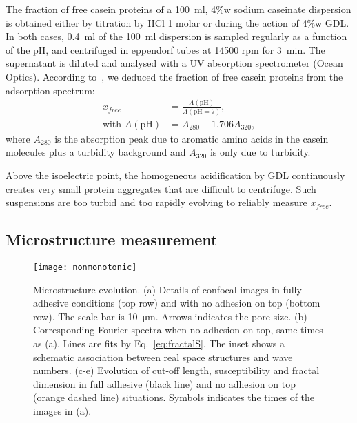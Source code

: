 \documentclass[twocolumn,superscriptaddress,showpacs,preprintnumbers,
amsmath,amssymb,prl]{revtex4-1}
\begin{document}
The fraction of free casein proteins of a \SI{100}{\milli\litre}, 4\%w sodium caseinate dispersion is obtained either by titration by HCl 1 molar or during the action of 4\%w GDL. In both cases, \SI{0.4}{\milli\litre} of the \SI{100}{\milli\litre} dispersion is sampled regularly as a function of the pH, and centrifuged in eppendorf tubes at 14500 rpm for \SI{3}{\minute}. The supernatant is diluted and analysed with a UV absorption spectrometer (Ocean Optics). According to~\cite{Roefs1986}, we deduced the fraction of free casein proteins from the adsorption spectrum:
%
\begin{align}
x_{free} &= \frac{A(\text{pH})}{A(\text{pH}=7)},\\
\text{with }A(\text{pH}) &= A_{280}-1.706 A_{320},
\end{align}
%
where $A_{280}$ is the absorption peak due to aromatic amino acids in the casein molecules plus a turbidity background and $A_{320}$ is only due to turbidity. 

Above the isoelectric point, the homogeneous acidification by GDL continuously creates very small protein aggregates that are difficult to centrifuge. Such suspensions are too turbid and too rapidly evolving to reliably measure $x_{free}$.

\subsection*{Microstructure measurement}

\begin{figure}
	\texttt{[image: nonmonotonic]}%
	\caption{Microstructure evolution. (a) Details of confocal images in fully adhesive conditions (top row) and with no adhesion on top (bottom row). The scale bar is \SI{10}{\micro\metre}. Arrows indicates the pore size. (b) Corresponding Fourier spectra when no adhesion on top, same times as (a). Lines are fits by Eq.~\ref{eq:fractalS}. The inset shows a schematic association between real space structures and wave numbers. (c-e) Evolution of cut-off length, susceptibility and fractal dimension in full adhesive (black line) and no adhesion on top (orange dashed line) situations. Symbols indicates the times of the images in (a).}%
	\label{fig:nonmonotonic}%
\end{figure}
\end{document}
